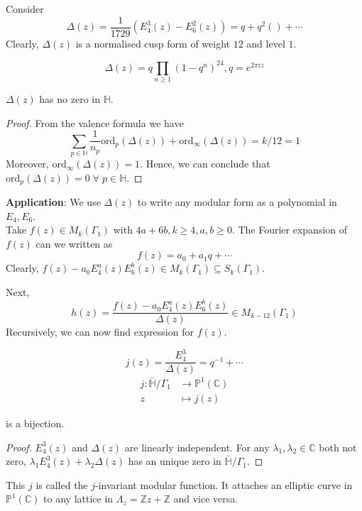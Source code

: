 \documentclass[oneside, 12pt, ]{scrbook}
\newcommand{\CC}{\mathbb C}
\newcommand{\ZZ}{\mathbb Z}
\newcommand{\PP}{\mathbb{P}}
\newcommand{\ord}{\mathrm{ord}}
\theoremstyle{theorem}
\begin{document}
Consider $$\Delta (z) = \frac{1}{1729} (E_{4}^3(z) - E_{6}^2(z)) = q + q^2() + \cdots $$
Clearly, $\Delta(z)$ is a normalised cusp form of weight $12$ and level $1$. 

\begin{theorem}
$$\Delta (z) = q \prod_{n \geq 1} (1-q^{n})^{24}, q=e^{2\pi i z}$$
\end{theorem}

\begin{proposition}
$\Delta(z)$ has no zero in $\mathbb{H}$.
\end{proposition}

\begin{proof}
From the valence formula we have $$\sum_{p \in \mathbb{H}} \frac{1}{n_{p}} \ord_{p}(\Delta(z)) + \ord_{\infty} (\Delta(z)) = k/12 =1$$ Moreover, $\ord_{\infty} (\Delta(z))=1$. Hence, we can conclude that $\ord_{p}(\Delta(z)) =0 \; \forall \; p \in \mathbb{H}$.
\end{proof}

\textbf{Application}: We use $\Delta(z)$ to write any modular form as a polynomial in $E_{4},E_{6}$. \\

Take $f(z) \in M_{k} (\Gamma_{1})$ with $4a+6b , k \geq 4, a,b\geq 0$. The Fourier expansion of $f(z)$ can we written as $$f(z) = a_{0} + a_{1}q + \cdots $$
Clearly, $f(z) - a_{0}E_{4}^a(z)E_{6}^b(z) \in M_{k}(\Gamma_{1}) \subseteq S_{k}(\Gamma_{1})$.

Next, $$h(z) = \frac{f(z)-a_{0}E_{4}^a(z)E_{6}^b(z)}{\Delta(z)} \in M_{k-12}(\Gamma_{1})$$ Recursively, we can now find expression for $f(z)$. 

\begin{proposition}
$$j(z) = \frac{E_{4}^3}{\Delta(z)} = q^{-1} + \cdots $$
\begin{align*}
j: \bar{\mathbb{H}}/\Gamma_{1} &\rightarrow \PP^1(\CC) \\
z &\mapsto j(z)
\end{align*}

is a bijection.
\end{proposition}

\begin{proof}
$E_{4}^3(z)$ and $\Delta(z)$ are linearly independent. For any $\lambda_{1},\lambda_{2} \in \CC$ both not zero, $\lambda_{1}E_{4}^3(z) + \lambda_{2}\Delta(z)$ has an unique zero in $\bar{\mathbb{H}}/\Gamma_{1}$. 
\end{proof}

\begin{remark}
This $j$ is called the $j$-invariant modular function. It attaches an elliptic curve in $\PP^1 (\CC)$ to any lattice in $\Lambda_{z} = \ZZ z + \ZZ$ and vice versa.
\end{remark}
\end{document}
